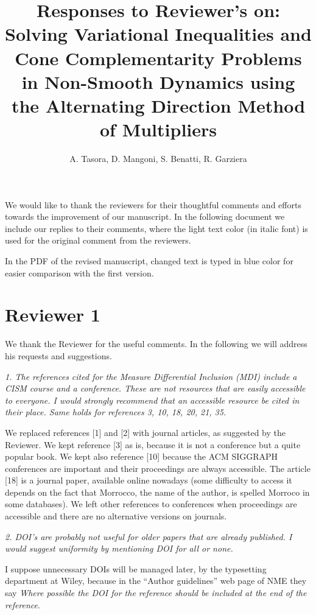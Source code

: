 \documentclass[final,12pt]{article}
\title{ \textbf{Responses to Reviewer's  on:} \\
Solving Variational Inequalities and Cone Complementarity Problems in Non-Smooth Dynamics using the Alternating Direction Method of Multipliers}
\author{A. Tasora, D. Mangoni, S. Benatti, R. Garziera}
\def\reviewercomment#1{{\vskip4mm \color{mycommentcolor} \textit{#1} \vskip2mm}}
\begin{document}
\maketitle




We would like to thank the reviewers for their thoughtful comments and
efforts towards the improvement of our manuscript. In the following document we include
our replies to their comments, where the {\color{mycommentcolor} light text color} (in italic font) is used
for the original comment from the reviewers.

In the PDF of the revised manuscript, changed text is typed in {\color{blucolor} blue color} for easier comparison with the first version.



\section{Reviewer 1}

We thank the Reviewer for the useful comments. 
In the following we will address his requests and suggestions.


\reviewercomment{
1. The references cited for the Measure Differential Inclusion (MDI) include a CISM course and a
conference. These are not resources that are easily accessible to everyone. I would strongly
recommend that an accessible resource be cited in their place. Same holds for references 3,
10, 18, 20, 21, 35.
}

We replaced references [1] and [2] with journal articles, as suggested by the Reviewer. We kept reference [3] as is, because it is not a conference but a quite popular book. We kept also reference [10] because the ACM SIGGRAPH conferences are important and their proceedings are always accessible. The article [18] is a journal paper, available online nowadays (some difficulty to access it depends on the fact that Morrocco, the name of the author, is spelled Morroco in some databases). We left other references to conferences when proceedings are accessible and there are no alternative versions on journals.  


\reviewercomment{
2. DOI’s are probably not useful for older papers that are already published. I would suggest
uniformity by mentioning DOI for all or none.
}

I suppose unnecessary DOIs will be managed later, by the typesetting department at Wiley, because in the "`Author guidelines"' web page of NME they say \textit{Where possible the DOI for the reference should be included at the end of the reference}. 
\end{document}
